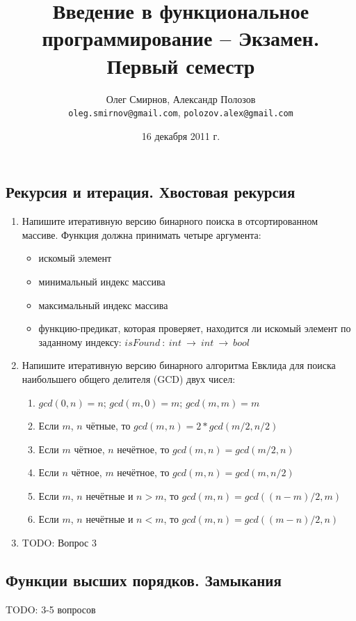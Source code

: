 \documentclass[a4paper,11pt]{article}
\author{Олег Смирнов, Александр Полозов \\
\texttt{oleg.smirnov@gmail.com}, \texttt{polozov.alex@gmail.com}}
\date{16 декабря 2011 г.}
\title{Введение в функциональное программирование -- Экзамен. Первый семестр}
\begin{document}
\subsection*{Рекурсия и итерация. Хвостовая рекурсия}
\begin{enumerate}
\item Напишите итеративную версию бинарного поиска в отсортированном массиве.
  Функция должна принимать четыре аргумента:
  \begin{itemize}
  \item искомый элемент
  \item минимальный индекс массива
  \item максимальный индекс массива
  \item функцию-предикат, которая проверяет, находится ли искомый элемент по
    заданному индексу: $isFound~:~int~\rightarrow~int~\rightarrow~bool$
  \end{itemize}

\item Напишите итеративную версию бинарного алгоритма Евклида для поиска
  наибольшего общего делителя (GCD) двух чисел:
  \begin{enumerate}
  \item $gcd(0, n) = n$; $gcd(m, 0) = m$; $gcd(m, m) = m$
  \item Если $m$, $n$ чётные, то $gcd(m, n) = 2*gcd(m/2, n/2)$
  \item Если $m$ чётное, $n$ нечётное, то $gcd(m, n) = gcd(m/2, n)$
  \item Если $n$ чётное, $m$ нечётное, то $gcd(m, n) = gcd(m, n/2)$
  \item Если $m$, $n$ нечётные и $n > m$, то $gcd(m, n) = gcd((n - m)/2, m)$
  \item Если $m$, $n$ нечётные и $n < m$, то $gcd(m, n) = gcd((m - n)/2, n)$
  \end{enumerate}

\item TODO: Вопрос 3
\end{enumerate}

\subsection*{Функции высших порядков. Замыкания}

TODO: 3-5 вопросов
\end{document}
